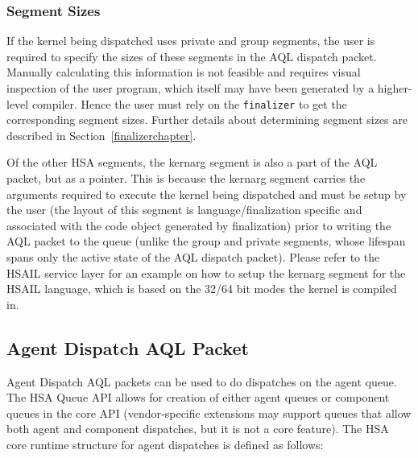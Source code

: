 \documentclass{book}
\begin{document}
 

\hypertarget{segment_sizes}{}\subsubsection{Segment
Sizes}\label{segment_sizes}
If the kernel being dispatched uses private and group segments, the
user is required to specify the sizes of these segments in the AQL
dispatch packet. Manually calculating this information is not
feasible and requires visual inspection of the user program, which itself
may have been generated by a higher-level compiler. Hence the user
must rely on the \texttt{finalizer} to get the corresponding segment
sizes. Further details about determining segment sizes are described in
Section~\ref{finalizerchapter}.

Of the other HSA segments, the kernarg segment is also a part of the
AQL packet, but as a pointer. This is because the kernarg segment
carries the arguments required to execute the kernel being dispatched
and must be setup by the user (the layout of this segment is
language/finalization specific and associated with the code object
generated by finalization) prior to writing the AQL packet to the
queue (unlike the group and private segments, whose lifespan spans
only the active state of the AQL dispatch packet).  Please refer to
the HSAIL service layer for an example on how to setup the kernarg
segment for the HSAIL language, which is based on the 32/64 bit modes
the kernel is compiled in.

\hypertarget{agent_packet}{}\subsection{Agent Dispatch AQL
Packet}\label{agent_packet}
Agent Dispatch AQL packets can be used to do dispatches on the agent
queue. The HSA Queue API allows for creation of either agent queues
or component queues in the core API (vendor-specific extensions may
support queues that allow both agent and component dispatches, but
it is not a core feature). The HSA core runtime structure for agent
dispatches is defined as follows:

\makeatletter{}
\end{document}
